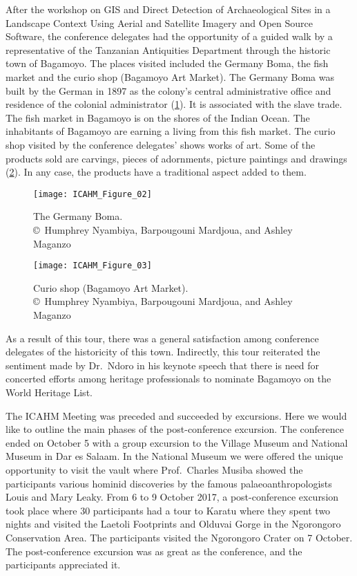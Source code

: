
After the workshop on GIS and Direct Detection of Archaeological Sites in a Landscape Context Using Aerial and Satellite Imagery and Open Source Software, the conference delegates had the opportunity of a guided walk by a representative of the Tanzanian Antiquities Department through the historic town of Bagamoyo. The places visited included the Germany Boma, the fish market and the curio shop (Bagamoyo Art Market). The Germany Boma was built by the German in 1897 as the colony’s central administrative office and residence of the colonial administrator (\cref{fig:ICAHM_Figure_02}). It is associated with the slave trade. The fish market in Bagamoyo is on the shores of the Indian Ocean. The inhabitants of Bagamoyo are earning a living from this fish market. The curio shop visited by the conference delegates’ shows works of art. Some of the products sold are carvings, pieces of adornments, picture paintings and drawings (\cref{fig:ICAHM_Figure_03}). In any case, the products have a traditional aspect added to them.

\begin{figure}[!htb]
	\texttt{[image: ICAHM\_Figure\_02]}
	\caption{The Germany Boma.
		{\normalfont\scriptsize \\ \copyright\
			Humphrey Nyambiya, Barpougouni Mardjoua, and Ashley Maganzo %
	}}
	\label{fig:ICAHM_Figure_02}
\end{figure}

\begin{figure}[!htb]
	\texttt{[image: ICAHM\_Figure\_03]}
	\caption{Curio shop (Bagamoyo Art Market).
		{\normalfont\scriptsize \\ \copyright\
			Humphrey Nyambiya, Barpougouni Mardjoua, and Ashley Maganzo %
	}}
	\label{fig:ICAHM_Figure_03}
\end{figure}

As a result of this tour, there was a general satisfaction among conference delegates of the historicity of this town. Indirectly, this tour reiterated the sentiment made by Dr.~Ndoro in his keynote speech that there is need for concerted efforts among heritage professionals to nominate Bagamoyo on the World Heritage List.

The ICAHM Meeting was preceded and succeeded by excursions. Here we would like to outline the main phases of the post-conference excursion. The conference ended on October 5 with a group excursion to the Village Museum and National Museum in Dar es Salaam. In the National Museum we were offered the unique opportunity to visit the vault where Prof.~Charles Musiba showed the participants various hominid discoveries by the famous palaeoanthropologists Louis and Mary Leaky.  From 6 to 9 October 2017, a post-conference excursion took place where 30 participants had a tour to Karatu where they spent two nights and visited the Laetoli Footprints and Olduvai Gorge in the Ngorongoro Conservation Area. The participants visited the Ngorongoro Crater on 7 October. The post-conference excursion was as great as the conference, and the participants appreciated it.

